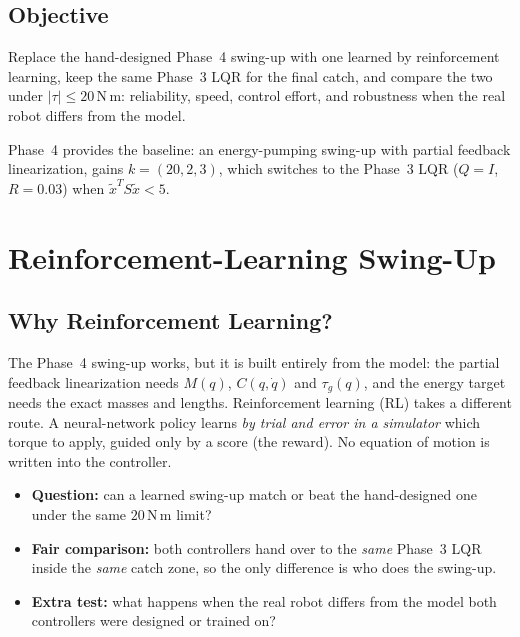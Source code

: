 \documentclass[12pt,a4paper]{article}
\newcommand{\Nm}{\,\mathrm{N\,m}}
\begin{document}
\subsection{Objective}
Replace the hand-designed Phase~4 swing-up with one learned by reinforcement learning, keep the same Phase~3 LQR for the final catch, and compare the two under $|\tau|\le20\Nm$: reliability, speed, control effort, and robustness when the real robot differs from the model.

Phase~4 provides the baseline: an energy-pumping swing-up with partial feedback linearization, gains $k=(20,2,3)$, which switches to the Phase~3 LQR ($Q=I$, $R=0.03$) when $\tilde x^TS\tilde x<5$.

\section{Reinforcement-Learning Swing-Up}
\subsection{Why Reinforcement Learning?}
The Phase~4 swing-up works, but it is built entirely from the model: the partial feedback linearization needs $M(q)$, $C(q,\dot q)$ and $\tau_g(q)$, and the energy target needs the exact masses and lengths. Reinforcement learning (RL) takes a different route. A neural-network policy learns \emph{by trial and error in a simulator} which torque to apply, guided only by a score (the reward). No equation of motion is written into the controller.
\begin{itemize}
\item \textbf{Question:} can a learned swing-up match or beat the hand-designed one under the same $20\Nm$ limit?
\item \textbf{Fair comparison:} both controllers hand over to the \emph{same} Phase~3 LQR inside the \emph{same} catch zone, so the only difference is who does the swing-up.
\item \textbf{Extra test:} what happens when the real robot differs from the model both controllers were designed or trained on?
\end{itemize}
\end{document}
